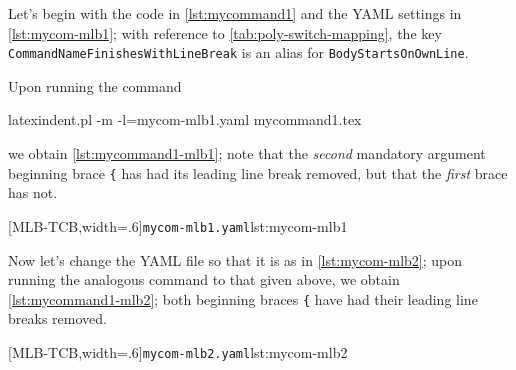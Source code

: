  \begin{example}
 Let's begin with the code in \cref{lst:mycommand1} and the YAML settings in
 \cref{lst:mycom-mlb1}; with reference to \vref{tab:poly-switch-mapping}, the key
 \texttt{CommandNameFinishesWithLineBreak} is an alias for \texttt{BodyStartsOnOwnLine}.


 Upon running the command  

 \begin{commandshell}
latexindent.pl -m -l=mycom-mlb1.yaml mycommand1.tex
\end{commandshell}

 we obtain \cref{lst:mycommand1-mlb1}; note that the \emph{second} mandatory argument
 beginning brace \lstinline!{! has had its leading line break removed, but that the
 \emph{first} brace has not.

 \begin{cmhtcbraster}[
   raster force size=false,
   raster column 1/.style={add to width=-1cm},
  ]
  [MLB-TCB,width=.6\textwidth]{\texttt{mycom-mlb1.yaml}}{lst:mycom-mlb1}
 \end{cmhtcbraster}
 \end{example}

 \begin{example}
 Now let's change the YAML file so that it is as in \cref{lst:mycom-mlb2}; upon running
 the analogous command to that given above, we obtain \cref{lst:mycommand1-mlb2}; both
 beginning braces \lstinline!{! have had their leading line breaks removed.

 \begin{cmhtcbraster}[
   raster force size=false,
   raster column 1/.style={add to width=-1cm},
  ]
  [MLB-TCB,width=.6\textwidth]{\texttt{mycom-mlb2.yaml}}{lst:mycom-mlb2}
 \end{cmhtcbraster}
 \end{example}


